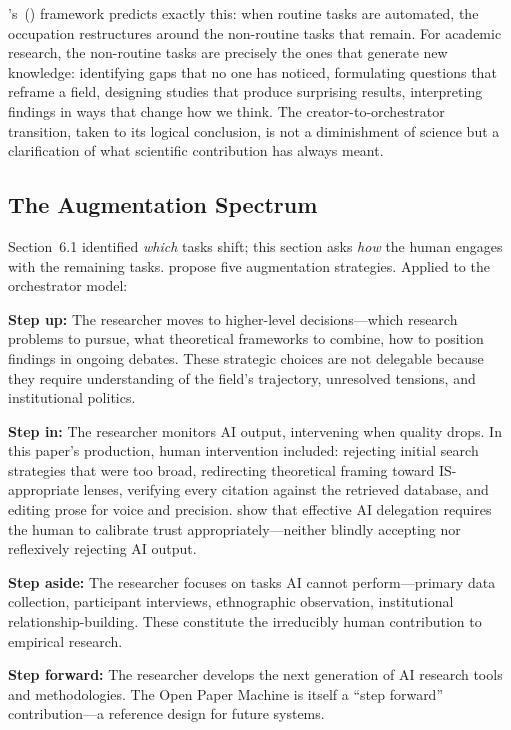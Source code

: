 \documentclass{article}
\begin{document}
\citeauthor{autor2015why}'s~(\citeyear{autor2015why}) framework predicts exactly this: when routine tasks are automated, the occupation restructures around the non-routine tasks that remain. For academic research, the non-routine tasks are precisely the ones that generate new knowledge: identifying gaps that no one has noticed, formulating questions that reframe a field, designing studies that produce surprising results, interpreting findings in ways that change how we think. The creator-to-orchestrator transition, taken to its logical conclusion, is not a diminishment of science but a clarification of what scientific contribution has always meant.

\subsection{The Augmentation Spectrum}

Section~6.1 identified \textit{which} tasks shift; this section asks \textit{how} the human engages with the remaining tasks. \citet{davenport2016just} propose five augmentation strategies. Applied to the orchestrator model:

\textbf{Step up:} The researcher moves to higher-level decisions---which research problems to pursue, what theoretical frameworks to combine, how to position findings in ongoing debates. These strategic choices are not delegable because they require understanding of the field's trajectory, unresolved tensions, and institutional politics.

\textbf{Step in:} The researcher monitors AI output, intervening when quality drops. In this paper's production, human intervention included: rejecting initial search strategies that were too broad, redirecting theoretical framing toward IS-appropriate lenses, verifying every citation against the retrieved database, and editing prose for voice and precision. \citet{hemmer2023delegation} show that effective AI delegation requires the human to calibrate trust appropriately---neither blindly accepting nor reflexively rejecting AI output.

\textbf{Step aside:} The researcher focuses on tasks AI cannot perform---primary data collection, participant interviews, ethnographic observation, institutional relationship-building. These constitute the irreducibly human contribution to empirical research.

\textbf{Step forward:} The researcher develops the next generation of AI research tools and methodologies. The Open Paper Machine is itself a ``step forward'' contribution---a reference design for future systems.
\end{document}

